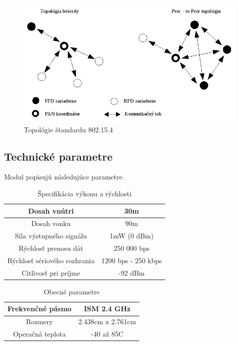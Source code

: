 \documentclass[11pt,twoside,a4paper]{book}
\begin{document}
\begin{figure}[h]
 \centering
 \includegraphics[width=12cm]{./figures/topologies802154.png}
 \caption{Topológie štandardu 802.15.4}
 \label{fig:80215topologies}
\end{figure}


\subsection{Technické parametre}
Modul popisujú následujúce parametre\cite{XBee}.

\begin{table}[htbp]
\begin{center}
\begin{tabular}{|c|c|}
\hline Dosah vnútri & 30m \\ 
\hline Dosah vonku & 90m \\ 
\hline Sila výstupného signálu & 1mW (0 dBm) \\
\hline Rýchlosť prenosu dát & 250 000 bps \\ 
\hline Rýchlosť sériového rozhrania & 1200 bps - 250 kbps \\ 
\hline Citlivosť pri príjme & -92 dBm \\
\hline 
\end{tabular} 
\end{center}
\caption{Špecifikácia výkonu a rýchlosti}
\label{tab:tab1}
\end{table}

\begin{table}[htbp]
\begin{center}
\begin{tabular}{|c|c|}
\hline Frekvenčné pásmo & ISM 2.4 GHz \\ 
\hline Rozmery & 2.438cm x 2.761cm \\ 
\hline Operačná teplota & -40 až 85C \\ 
\hline 
\end{tabular} 
\end{center}
\caption{Obecné parametre}
\label{tab:tab2}
\end{table}
\end{document}
